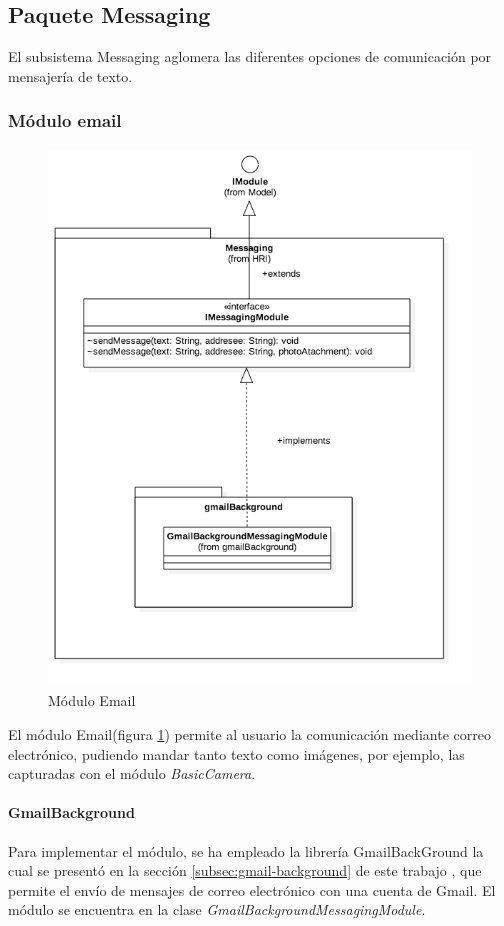 \newpage
\subsection{Paquete Messaging}
El subsistema Messaging aglomera las diferentes opciones de comunicación por mensajería de texto.

\subsubsection{Módulo email}
\begin{figure}
	\centering
	\includegraphics[width=0.7\linewidth]{imagenes/diagramas/MessagingModule.png}
	\caption{Módulo Email}
	\label{fig:email-module}
\end{figure}
El módulo Email(figura \ref{fig:email-module}) permite al usuario la comunicación mediante correo electrónico, pudiendo mandar tanto texto como imágenes, por ejemplo, las capturadas con el módulo \textit{BasicCamera}.

\paragraph*{GmailBackground\\}
Para implementar el módulo, se ha empleado la librería GmailBackGround \cite{gmailbg} la cual se presentó en la sección \ref{subsec:gmail-background} de este trabajo , que permite el envío de mensajes de correo electrónico con una cuenta de Gmail. El módulo se encuentra en la clase \textit{GmailBackgroundMessagingModule}.


